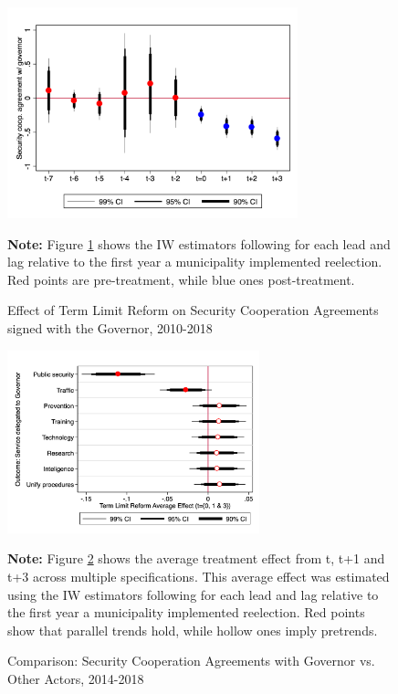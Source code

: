 \begin{figure}[h] 
\centering
 \caption{Effect of Term Limit Reform on Security Cooperation Agreements signed with the Governor, 2010-2018}
 \label{fig:event_study_agreements}
\includegraphics[width=0.75\textwidth]{Figures/catts_agreements.png}
       \captionsetup{justification=centering}
       
 \textbf{Note:} Figure \ref{fig:event_study_agreements} shows the IW estimators following \citet{abraham_sun_2020} for each lead and lag relative to the first year a municipality implemented reelection. Red points are pre-treatment, while blue ones post-treatment. 
     
\end{figure}   

 \begin{figure}[h]   
\centering
 \caption{Comparison: Security Cooperation Agreements with Governor vs. Other Actors, 2014-2018}
 \label{fig:services}
\includegraphics[width=0.65\textwidth]{Figures/services.png}
       \captionsetup{justification=centering}
       
 \textbf{Note:} Figure \ref{fig:services} shows the average treatment effect from t, t+1 and t+3 across multiple specifications. This average effect was estimated using the IW estimators following \citet{abraham_sun_2020} for each lead and lag relative to the first year a municipality implemented reelection. Red points show that parallel trends hold, while hollow ones imply pretrends. 
\end{figure}  

